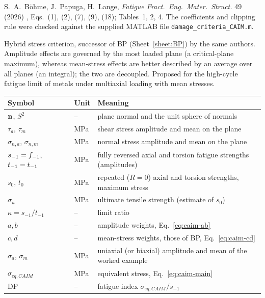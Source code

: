 \label{sheet:CAIM}

 S.~A.~B\"ohme, J.~Papuga, H.~Lange, \emph{Fatigue Fract.\ Eng.\ Mater.\ Struct.}
49 (2026) \cite{bohme2026}, Eqs.~(1), (2), (7), (9), (18); Tables~1, 2, 4. The coefficients and
clipping rule were checked against the supplied MATLAB file \texttt{damage\_criteria\_CAIM.m}.

 Hybrid stress criterion, successor of BP (Sheet~\ref{sheet:BP}) by the same
authors. Amplitude effects are governed by the most loaded plane (a critical-plane maximum),
whereas mean-stress effects are better described by an average over all planes (an integral); the
two are decoupled. Proposed for the high-cycle fatigue limit of metals under multiaxial loading with
mean stresses.

\begin{center}\small
\begin{tabular}{@{}llp{100mm}@{}}
\toprule
Symbol & Unit & Meaning\\\midrule
$\mathbf n$, $S^2$ & -- & plane normal and the unit sphere of normals\\
$\tau_a$, $\tau_m$ & MPa & shear stress amplitude and mean on the plane\\
$\sigma_{n,a}$, $\sigma_{n,m}$ & MPa & normal stress amplitude and mean on the plane\\
$s_{-1}=f_{-1}$, $t_{-1}=t_{-1}$ & MPa & fully reversed axial and torsion fatigue strengths (amplitudes)\\
$s_0$, $t_0$ & MPa & repeated ($R=0$) axial and torsion strengths, maximum stress\\
$\sigma_u$ & MPa & ultimate tensile strength (estimate of $s_0$)\\
$\kappa=s_{-1}/t_{-1}$ & -- & limit ratio\\
$a,b$ & -- & amplitude weights, Eq.~\eqref{eq:caim-ab}\\
$c,d$ & -- & mean-stress weights, those of BP, Eq.~\eqref{eq:caim-cd}\\
$\sigma_a$, $\sigma_m$ & MPa & uniaxial (or biaxial) amplitude and mean of the worked example\\
$\sigma_{eq,CAIM}$ & MPa & equivalent stress, Eq.~\eqref{eq:caim-main}\\
$\mathrm{DP}$ & -- & fatigue index $\sigma_{eq,CAIM}/s_{-1}$\\
\bottomrule
\end{tabular}
\end{center}

